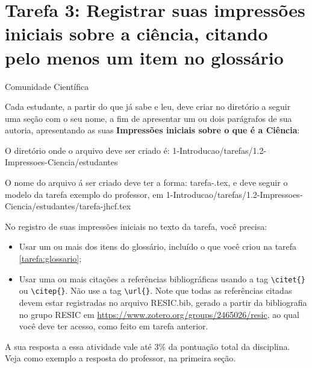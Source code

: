 \section{Tarefa 3: Registrar suas impressões iniciais sobre a ciência, citando pelo menos  um item no glossário}

\gls{Comunidade Científica}

Cada estudante, a partir do que já sabe e leu, deve criar no diretório a seguir uma seção com o seu nome, a fim de apresentar um ou dois parágrafos de sua autoria, apresentando as suas \textbf{Impressões iniciais sobre o que é a Ciência}: 

O diretório onde o arquivo deve ser criado é: 
1-Introducao/tarefas/1.2-Impressoes-Ciencia/estudantes

O nome do arquivo á ser criado deve ter a forma:
tarefa-\githubusername.tex, e deve seguir o modelo da tarefa exemplo do professor, em
1-Introducao/tarefas/1.2-Impressoes-Ciencia/estudantes/tarefa-jhcf.tex

No registro de suas impressões iniciais no texto da tarefa, você precisa:
\begin{itemize}
    \item Usar um ou mais dos itens do glossário, incluído o que você criou na tarefa \ref{tarefa:glossario};
    \item Usar uma ou mais citações a referências bibliográficas usando a tag \verb|\citet{}| ou \verb|\citep{}|. Não use a tag \verb|\url{}|. Note que todas as referências citadas devem estar registradas no arquivo RESIC.bib, gerado a partir da bibliografia no grupo RESIC em \url{https://www.zotero.org/groups/2465026/resic}, ao qual você deve ter acesso, como feito em tarefa anterior.
\end{itemize}

A sua resposta a essa atividade vale até 3\% da pontuação total da disciplina.
Veja como exemplo a resposta do professor, na primeira seção.



